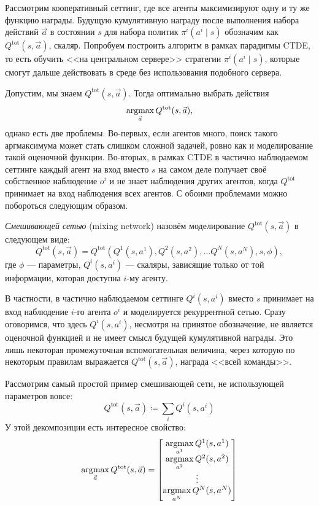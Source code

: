 Рассмотрим кооперативный сеттинг, где все агенты максимизируют одну и ту же функцию награды. Будущую кумулятивную награду после выполнения набора действий $\vec{a}$ в состоянии $s$ для набора политик $\pi^i(a^i \mid s)$ обозначим как $Q^{\mathrm{tot}}(s, \vec{a})$, скаляр. Попробуем построить алгоритм в рамках парадигмы CTDE, то есть обучить <<на центральном сервере>> стратегии $\pi^i(a^i \mid s)$, которые смогут дальше действовать в среде без использования подобного сервера.

Допустим, мы знаем $Q^{\mathrm{tot}}(s, \vec{a})$. Тогда оптимально выбрать действия
$$\mathop{\mathrm{argmax}}_{\vec{a}} Q^{\mathrm{tot}}(s, \vec{a}),$$
однако есть две проблемы. Во-первых, если агентов много, поиск такого аргмаксимума может стать слишком сложной задачей, ровно как и моделирование такой оценочной функции. Во-вторых, в рамках CTDE в частично наблюдаемом сеттинге каждый агент на вход вместо $s$ на самом деле получает своё собственное наблюдение $o^i$ и не знает наблюдения других агентов, когда $Q^{\mathrm{tot}}$ принимает на вход наблюдения всех агентов. С обоими проблемами можно побороться следующим образом.

\begin{definition}
\emph{Смешивающей сетью} (mixing network) назовём моделирование $Q^{\mathrm{tot}}(s, \vec{a})$ в следующем виде:
\begin{equation}\label{vdn}
Q^{\mathrm{tot}}(s, \vec{a}) = Q^{\mathrm{tot}}(Q^1(s, a^1), Q^2(s, a^2), \dots Q^N(s, a^N), s, \phi),
\end{equation}
где $\phi$ --- параметры, $Q^i(s, a^i)$ --- скаляры, зависящие только от той информации, которая доступна $i$-му агенту.
\end{definition}

В частности, в частично наблюдаемом сеттинге $Q^i(s, a^i)$ вместо $s$ принимает на вход наблюдение $i$-го агента $o^i$ и моделируется рекуррентной сетью. Сразу оговоримся, что здесь $Q^i(s, a^i)$, несмотря на принятое обозначение, не является оценочной функцией и не имеет смысл будущей кумулятивной награды. Это лишь некоторая промежуточная вспомогательная величина, через которую по некоторым правилам выражается $Q^{\mathrm{tot}}(s, \vec{a})$, награда <<всей команды>>.

\begin{example} Рассмотрим самый простой пример смешивающей сети, не использующей параметров вовсе:
$$Q^{\mathrm{tot}}(s, \vec{a}) \coloneqq \sum_i Q^i(s, a^i)$$
У этой декомпозиции есть интересное свойство: 
\begin{equation}\label{consistent_vdn}
\mathop{\mathrm{argmax}}_{\vec{a}} Q^{\mathrm{tot}}(s, \vec{a}) = \left[ 
\begin{matrix}
\mathop{\mathrm{argmax}}\limits_{a^1} Q^1(s, a^1) \\
\mathop{\mathrm{argmax}}\limits_{a^2} Q^2(s, a^2) \\
\vdots \\
\mathop{\mathrm{argmax}}\limits_{a^N} Q^N(s, a^N) \\
\end{matrix}
\right]
\end{equation}
\end{example}

